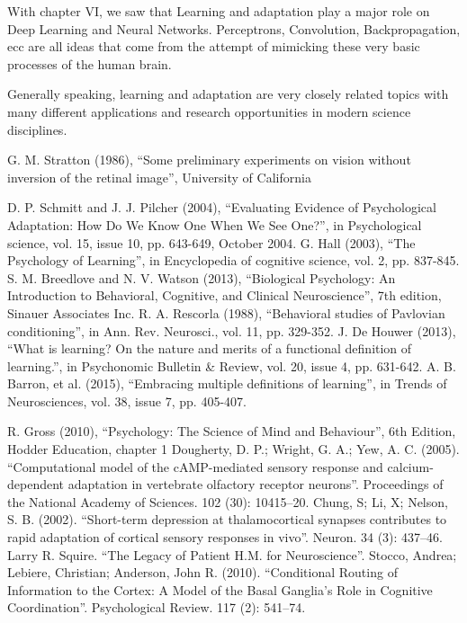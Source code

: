 \documentclass[conference]{IEEEtran}
\begin{document}
	With chapter VI, we saw that Learning and adaptation play a major role on Deep Learning and Neural Networks. Perceptrons, Convolution, Backpropagation, ecc are all ideas that come from the attempt of mimicking these very basic processes of the human brain.

	Generally speaking, learning and adaptation are very closely related topics with many different applications and research opportunities in modern science disciplines.

\begin{thebibliography}{00}
 G. M. Stratton (1986), ``Some preliminary experiments on vision without inversion of the retinal image'', University of California

 D. P. Schmitt and J. J. Pilcher (2004), ``Evaluating Evidence of Psychological Adaptation: How Do We Know One When We See One?'', in Psychological science, vol. 15, issue 10, pp. 643-649, October 2004.
 G. Hall (2003), ``The Psychology of Learning'', in Encyclopedia of cognitive science, vol. 2, pp. 837-845.
 S. M. Breedlove and N. V. Watson (2013), ``Biological Psychology: An Introduction to Behavioral, Cognitive, and Clinical Neuroscience'', 7th edition, Sinauer Associates Inc.
 R. A. Rescorla (1988), ``Behavioral studies of Pavlovian conditioning'', in Ann. Rev. Neurosci., vol. 11, pp. 329-352.
 J. De Houwer (2013), ``What is learning? On the nature and merits of a functional definition of learning.'', in Psychonomic Bulletin \& Review, vol. 20, issue 4, pp. 631-642.
 A. B. Barron, et al. (2015), ``Embracing multiple definitions of learning'', in Trends of Neurosciences, vol. 38, issue 7, pp. 405-407.

 R. Gross (2010), ``Psychology: The Science of Mind and Behaviour'', 6th Edition, Hodder Education, chapter 1
 Dougherty, D. P.; Wright, G. A.; Yew, A. C. (2005). ``Computational model of the cAMP-mediated sensory response and calcium-dependent adaptation in vertebrate olfactory receptor neurons''. Proceedings of the National Academy of Sciences. 102 (30): 10415–20.
 Chung, S; Li, X; Nelson, S. B. (2002). ``Short-term depression at thalamocortical synapses contributes to rapid adaptation of cortical sensory responses in vivo''. Neuron. 34 (3): 437–46.
 Larry R. Squire. ``The Legacy of Patient H.M. for Neuroscience''.
 Stocco, Andrea; Lebiere, Christian; Anderson, John R. (2010). ``Conditional Routing of Information to the Cortex: A Model of the Basal Ganglia's Role in Cognitive Coordination''. Psychological Review. 117 (2): 541–74.


\end{thebibliography}
\end{document}

